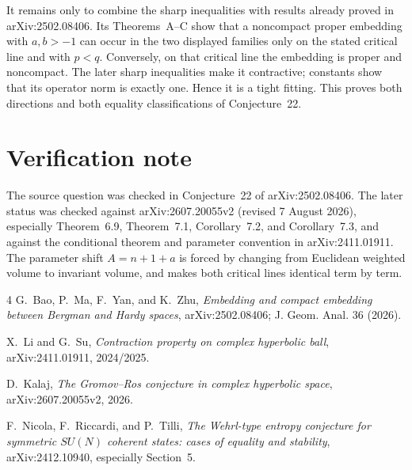 \documentclass[11pt]{article}
\begin{document}
It remains only to combine the sharp inequalities with results already proved
in arXiv:2502.08406.  Its Theorems~A--C show that a noncompact proper embedding
with $a,b>-1$ can occur in the two displayed families only on the stated
critical line and with $p<q$.  Conversely, on that critical line the embedding
is proper and noncompact.  The later sharp inequalities make it contractive;
constants show that its operator norm is exactly one.  Hence it is a tight
fitting.  This proves both directions and both equality classifications of
Conjecture~22.

\section{Verification note}

The source question was checked in Conjecture~22 of arXiv:2502.08406.  The
later status was checked against arXiv:2607.20055v2 (revised 7 August 2026),
especially Theorem~6.9, Theorem~7.1, Corollary~7.2, and Corollary~7.3, and
against the conditional theorem and parameter convention in
arXiv:2411.01911.  The parameter shift $A=n+1+a$ is forced by changing from
Euclidean weighted volume to invariant volume, and makes both critical lines
identical term by term.

\begin{thebibliography}{4}
G.~Bao, P.~Ma, F.~Yan, and K.~Zhu,
\emph{Embedding and compact embedding between Bergman and Hardy spaces},
arXiv:2502.08406; J. Geom. Anal. 36 (2026).

X.~Li and G.~Su,
\emph{Contraction property on complex hyperbolic ball},
arXiv:2411.01911, 2024/2025.

D.~Kalaj,
\emph{The Gromov--Ros conjecture in complex hyperbolic space},
arXiv:2607.20055v2, 2026.

F.~Nicola, F.~Riccardi, and P.~Tilli,
\emph{The Wehrl-type entropy conjecture for symmetric $SU(N)$ coherent states:
cases of equality and stability}, arXiv:2412.10940, especially Section~5.
\end{thebibliography}
\end{document}
